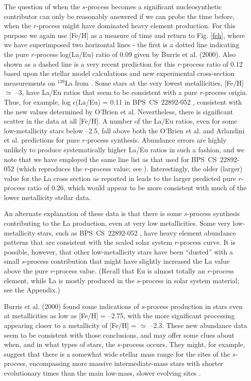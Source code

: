 \documentclass[12pt,preprint]{aastex}
\def\cs22{\mbox{BPS CS 22892-052}}
\begin{document}
{The question of when the $s$-process becomes a significant nucleosynthetic contributor can only be reasonably answered if we can probe the time before, when the $r$-process might have dominated heavy element production.  For this purpose we again use [Fe/H] as a measure of time and return to Fig. \ref{feh}, where we have superimposed two horizontal lines - the first is a dotted line indicating the pure $r$-process log(La/Eu) ratio of 0.09 given by Burris et al. (2000). Also shown as a dashed line is a very recent prediction for this $r$-process ratio of 0.12 based upon the \citet{Arlandini1999} stellar model calculations and new experimental cross-section measurements on $^{139}$La from \citet{OBrien2003}.  Some stars at the very lowest metallicities, [Fe/H] $\simeq$ --3, have La/Eu ratios that seem to be consistent with a pure $r$-process origin.  Thus, for example, log $\epsilon$(La/Eu) = 0.11 in \cs22 \citep{CS22892}, consistent with the new values determined by O'Brien et al.  Nevertheless, there is significant scatter in the data at all [Fe/H].  A number of the La/Eu ratios, even for some low-metallicity stars  below --2.5, fall above  both the O'Brien et al. and Arlandini et al. predictions for pure  $r$-process synthesis.  Abundance errors are highly unlikely to produce systematically higher La/Eu ratios in such a fashion, and we note that we have employed the same line list as that used for \cs22 (which reproduces the $r$-process value; see \citealt{CS22892}).   Interestingly, the older (larger) value for the La cross section as reported in \citealt{Arlandini1999} leads to the larger predicted pure $r$-process ratio of 0.26, which would appear to be more consistent with much of the lower metallicity stellar data.  

An alternate explanation of these data is that there is some $s$-process synthesis contributing to the La production, even at very low metallicities.  Some very low-metallicity stars, such as \cs22 \citep{CS22892}, have heavy element  abundance patterns that are consistent with the scaled solar system $r$-process curve.  It is possible, however, that other low-metallicity stars have been ``dusted'' with a small $s$-process contribution that might have slightly increased the La value above the pure $r$-process value. (Recall that Eu is almost totally an $r$-process element, while La is mostly produced in the $s$-process in solar system material; see the Appendix.) 

Burris et al. (2000) found some indications of $s$-process production in stars  even at metallicities as low as [Fe/H] = --2.75, with the more significant processing  appearing closer to a metallicity of [Fe/H] = $\simeq$ --2.3.  These new abundance data seem to be consistent with those conclusions,  and may offer some clues about when,  and in what types of stars, the $s$-process occurs.  They might, for example, suggest that there is a somewhat wide stellar mass range for the sites of the $s$-process, encompassing  more massive intermediate-mass stars with shorter evolutionary times than the main low-mass, slower evolving  sites \citep{Travaglio1999}. 

}
\end{document}
